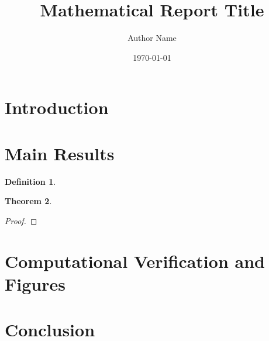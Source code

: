 \documentclass[11pt,a4paper]{article}
\title{Mathematical Report Title}
\author{Author Name}
\date{\today}
\theoremstyle{plain}
\newtheorem{theorem}{Theorem}[section]
\theoremstyle{definition}
\newtheorem{definition}[theorem]{Definition}
\theoremstyle{remark}
\begin{document}
\maketitle

\begin{abstract}
\end{abstract}

\section{Introduction}

\section{Main Results}

\begin{definition}
\end{definition}

\begin{theorem}
\end{theorem}

\begin{proof}
\end{proof}

\section{Computational Verification and Figures}



\section{Conclusion}
\end{document}
